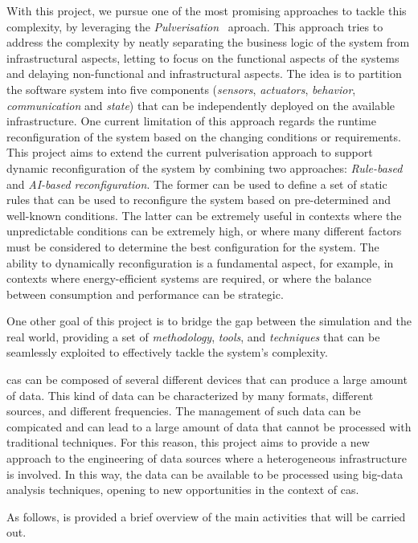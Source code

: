 \documentclass[12pt]{article}
\begin{document}
With this project,
we pursue one of the most promising approaches to tackle this complexity,
by leveraging the \emph{Pulverisation}~\cite{DBLP:journals/fi/CasadeiPPVW20} aproach.
%
This approach tries to address the complexity by neatly separating the business logic of the system from infrastructural aspects,
letting to focus on the functional aspects of the systems and delaying non-functional and infrastructural aspects.
%
The idea is to partition the software system into five components (\emph{sensors}, \emph{actuators}, \emph{behavior}, \emph{communication} and \emph{state})
that can be independently deployed on the available infrastructure.
%
One current limitation of this approach regards the runtime reconfiguration of the system based on the changing conditions or requirements.
%
This project aims to extend the current pulverisation approach to support dynamic reconfiguration of the system
by combining two approaches: \emph{Rule-based} and \emph{AI-based reconfiguration}.
%
The former can be used to define a set of static rules that can be used to reconfigure the system based on pre-determined and well-known conditions.
%
The latter can be extremely useful in contexts where the unpredictable conditions can be extremely high,
or where many different factors must be considered to determine the best configuration for the system.
%
The ability to dynamically reconfiguration is a fundamental aspect,
for example,
in contexts where energy-efficient systems are required,
or where the balance between consumption and performance can be strategic.

One other goal of this project is to bridge the gap between the simulation and the real world,
providing a set of \emph{methodology}, \emph{tools}, and \emph{techniques}
that can be seamlessly exploited to effectively tackle the system's complexity.

\ac{cas} can be composed of several different devices that can produce a large amount of data.
%
This kind of data can be characterized by many formats, different sources, and different frequencies.
%
The management of such data can be compicated and can lead to a large amount of data that cannot be processed with traditional techniques.
%
For this reason,
this project aims to provide a new approach to the engineering of data sources where a heterogeneous infrastructure is involved.
%
In this way,
the data can be available to be processed using big-data analysis techniques,
opening to new opportunities in the context of \ac{cas}.

As follows, is provided a brief overview of the main activities that will be carried out.
\end{document}
